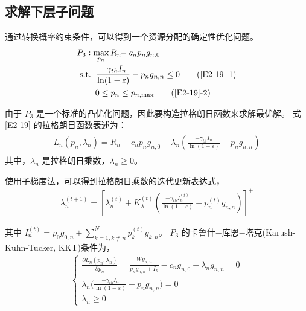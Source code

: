 \subsection{求解下层子问题}\label{section2-3-2}
通过转换概率约束条件，可以得到一个资源分配的确定性优化问题。
\begin{align}  \label{E2-19}
&P_3: \max \limits_{p_{n}} R_{n}\!\!-c_{n} p_n g_{n,0}              \\
&\text { s.t. }
 \quad \!\!\!\!\! \frac{-\gamma_{th} I_{n}}{\ln(1-\varepsilon)}-p_n g_{n,n}\leq0 \tag{\ref{E2-19}{-1}} \label{E2-19-1}\\ %
& \quad \quad \quad \!\!\!\!\! 0\leq p_n\leq p_{n,\textrm{max}}                  \tag{\ref{E2-19}{-2}} \label{E2-19-2}  %
\end{align}

由于 $P_3$ 是一个标准的凸优化问题，因此要构造拉格朗日函数来求解最优解。 式 \eqref{E2-19} 的拉格朗日函数表述为：
\begin{eqnarray}\label{E2-20}
\begin{array}{lll}
\textit{L}_n(p_n, \lambda_n)=R_{n}\!\!-\!\!c_{n} p_n g_{n,0}\!\!-\!\!\lambda_n \left(\frac{-\gamma_{th} I_{n}}{\ln(1-\varepsilon)}-p_n g_{n,n}\right)
\end{array}
\end{eqnarray}
其中，$\lambda_n$ 是拉格朗日乘数，$\lambda_n \geq 0$。

使用子梯度法，可以得到拉格朗日乘数的迭代更新表达式，
\begin{equation}\label{E2-21}
\begin{array}{lll}
     \lambda_n^{(t+1)}=[\lambda_n^{(t)}\!\!+\!K_{\lambda}^{(t)}(\frac{-\gamma_{th} I_{n}^{(t)}}{\ln(1-\varepsilon)}-p_n^{(t)} g_{n,n})]^+
\end{array}
\end{equation}

其中 $I_{n}^{(t)}=$$p_0 g_{0,n}+\sum_{k=1,k\neq n}^N p_k^{(t)} g_{k,n}$。
$P_3$ 的卡鲁什$-$库恩$-$塔克(Karush-Kuhn-Tucker, KKT)条件为，
\begin{equation}\label{E2-22}
\begin{array}{rl}
\left\{
\begin{array}{lll}
     \frac{\partial \textit{L}_n(p_n, \lambda_n)}{\partial p_n}\!=\!\frac{W g_{n,n}}{p_n g_{n,n}+I_n}\!-\!c_n g_{n,0}\!-\!\lambda_n g_{n,n}\!=\!0\\
     \lambda_n \big(\frac{-\gamma_{th} I_{n}}{\ln(1-\varepsilon)}-p_n g_{n,n}\big)=0\\
     \lambda_n \geq 0
\end{array}
\right.
\end{array}
\end{equation}

